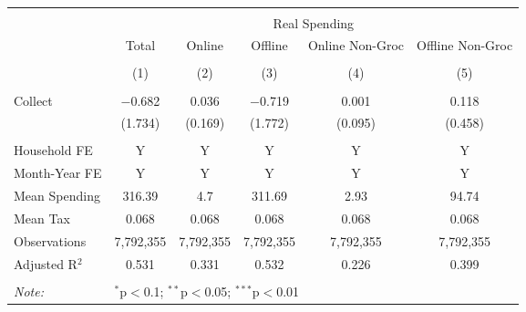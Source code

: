 
\begin{table}[!htbp] \centering 
  \caption{} 
  \label{} 
\begin{tabular}{@{\extracolsep{5pt}}lccccc} 
\\[-1.8ex]\hline 
\hline \\[-1.8ex] 
 & \multicolumn{5}{c}{Real Spending} \\ 
\cline{2-6} 
 & Total & Online & Offline & Online Non-Groc & Offline Non-Groc \\ 
\\[-1.8ex] & (1) & (2) & (3) & (4) & (5)\\ 
\hline \\[-1.8ex] 
 Collect & $-$0.682 & 0.036 & $-$0.719 & 0.001 & 0.118 \\ 
  & (1.734) & (0.169) & (1.772) & (0.095) & (0.458) \\ 
 \hline \\[-1.8ex] 
Household FE & Y & Y & Y & Y & Y \\ 
Month-Year FE & Y & Y & Y & Y & Y \\ 
Mean Spending & 316.39 & 4.7 & 311.69 & 2.93 & 94.74 \\ 
Mean Tax & 0.068 & 0.068 & 0.068 & 0.068 & 0.068 \\ 
Observations & 7,792,355 & 7,792,355 & 7,792,355 & 7,792,355 & 7,792,355 \\ 
Adjusted R$^{2}$ & 0.531 & 0.331 & 0.532 & 0.226 & 0.399 \\ 
\hline 
\hline \\[-1.8ex] 
\textit{Note:}  & \multicolumn{5}{l}{$^{*}$p$<$0.1; $^{**}$p$<$0.05; $^{***}$p$<$0.01} \\ 
\end{tabular} 
\end{table} 
